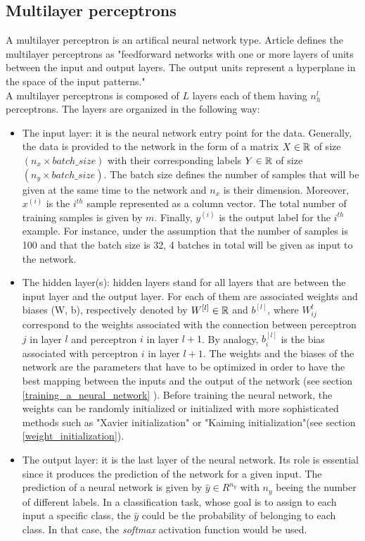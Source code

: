 \subsection{Multilayer perceptrons}
\label{multilayer_perceptron}
A multilayer perceptron is an artifical neural network type. Article \cite{23} defines the multilayer perceptrons as "feedforward networks with one or more layers of units between the
input and output layers. The output units represent a hyperplane in the space
of the input patterns."\\
A multilayer perceptrons is composed of $L$ layers each of them having $n^{l}_{h}$ perceptrons. The layers are organized in the following way:
\begin{itemize}
\item The input layer: it is the neural network entry point for the data. Generally, the data is provided to the network in the form of a matrix $X \in \mathbb{R}$ of size $(n_{x} \times batch\_size)$ with their corresponding labels $Y \in \mathbb{R}$ of size $(n_{y} \times batch\_size)$. The batch size defines the number of samples that will be given at the same time to the network and $n_{x}$ is their dimension. Moreover, $x^{(i)}$ is the $i^{th}$ sample represented as a column vector. The total number of training samples is given by $m$. Finally, $y^{(i)}$ is the output label for the $i^{th}$ example. For instance, under the assumption that the number of samples is 100 and that the batch size is 32, 4 batches in total will be given as input to the network.
\item The hidden layer(s): hidden layers stand for all layers that are between the input layer and the output layer. For each of them are associated weights and biases (W, b), respectively denoted by $W^{[l]} \in \mathbb{R} $ and $b^{[l]}$, where $W_{ij}^{l}$ correspond to the weights associated with the connection between perceptron $j$ in layer $l$ and perceptron $i$ in layer $l+1$. By analogy, $b_{i}^{[l]}$ is the bias associated with perceptron $i$ in layer $l+1$. The weights and the biases of the network are the parameters that have to be optimized in order to have the best mapping between the inputs and the output of the network (see section \ref{training_a_neural_network} ). Before training the neural network, the weights can be randomly initialized or initialized with more sophisticated methods such as "Xavier initialization" or "Kaiming initialization"(see section \ref{weight_initialization}).
\item The output layer: it is the last layer of the neural network. Its role is essential since it produces the prediction of the network for a given input. The prediction of a neural network is given by $\hat{y} \in R^{n_{y}}$ with $n_{y}$ beeing the number of different labels. In a classification task, whose goal is to assign to each input a specific class, the $\hat{y}$ could be the probability of belonging to each class. In that case, the \textit{softmax} activation function would be used.
\end{itemize}
